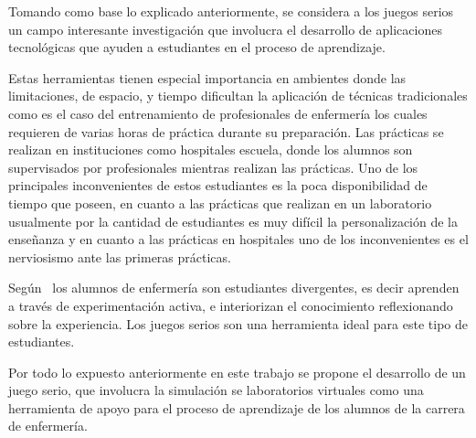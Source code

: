 


Tomando como base lo explicado anteriormente, se considera a los juegos serios
un campo interesante investigación que involucra el desarrollo de aplicaciones
tecnológicas que ayuden a estudiantes en el proceso de aprendizaje. 

Estas herramientas tienen especial importancia en ambientes donde las
limitaciones, de espacio, y tiempo dificultan la aplicación de técnicas
tradicionales\cite{education:games} como es el caso del entrenamiento de
profesionales de enfermería los cuales requieren de varias horas de práctica
durante su preparación. Las prácticas se realizan en instituciones como
hospitales escuela, donde los alumnos son supervisados por profesionales
mientras realizan las prácticas. Uno de los principales inconvenientes de estos
estudiantes es la poca disponibilidad de tiempo que poseen, en cuanto a las
prácticas que realizan en un laboratorio usualmente por la cantidad de
estudiantes es muy difícil la personalización de la enseñanza y en cuanto a las
prácticas en hospitales uno de los inconvenientes es el nerviosismo ante las
primeras prácticas.

Según~\cite{humphreys2013developing} los alumnos de enfermería son estudiantes
divergentes, es decir aprenden a través de experimentación activa, e
interiorizan el conocimiento reflexionando sobre la experiencia. Los juegos
serios son una herramienta ideal para este tipo de
estudiantes\cite{humphreys2013developing}. 

Por todo lo expuesto anteriormente en este trabajo se propone  el desarrollo de
un juego serio, que involucra la simulación se laboratorios virtuales como una
herramienta de apoyo para el proceso de aprendizaje de los alumnos de la carrera
de enfermería.




